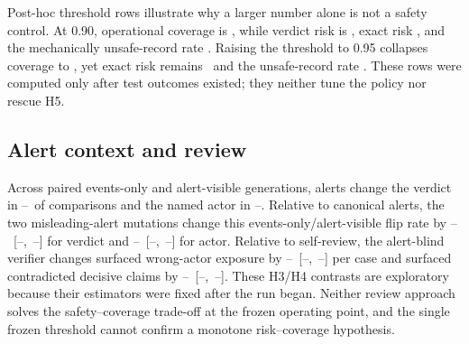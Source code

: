 \documentclass[letterpaper,twocolumn,10pt]{article}
\newcommand{\todoresult}{\textnormal{--}}
\newcommand{\AlertVerdictFlip}{\todoresult}
\newcommand{\AlertActorFlip}{\todoresult}
\providecommand{\HThreeVerdictDifference}{\todoresult}
\providecommand{\HThreeVerdictCILow}{\todoresult}
\providecommand{\HThreeVerdictCIHigh}{\todoresult}
\providecommand{\HThreeActorDifference}{\todoresult}
\providecommand{\HThreeActorCILow}{\todoresult}
\providecommand{\HThreeActorCIHigh}{\todoresult}
\providecommand{\HFourWrongActorDifference}{\todoresult}
\providecommand{\HFourWrongActorCILow}{\todoresult}
\providecommand{\HFourWrongActorCIHigh}{\todoresult}
\providecommand{\HFourContradictedDifference}{\todoresult}
\providecommand{\HFourContradictedCILow}{\todoresult}
\providecommand{\HFourContradictedCIHigh}{\todoresult}
\begin{document}
Post-hoc threshold rows illustrate why a larger number alone is not a safety
control.  At 0.90, operational coverage is \ConfidenceNinetyCoverage, while
verdict risk is \ConfidenceNinetyVerdictRisk, exact risk
\ConfidenceNinetyExactRisk, and the mechanically unsafe-record rate
\ConfidenceNinetyUnsafeRate.  Raising the threshold to 0.95 collapses coverage
to \ConfidenceNinetyFiveCoverage, yet exact risk remains
\ConfidenceNinetyFiveExactRisk\ and the unsafe-record rate
\ConfidenceNinetyFiveUnsafeRate.  These rows were computed only after test
outcomes existed; they neither tune the policy nor rescue H5.
\fi

\subsection{Alert context and review}

Across paired events-only and alert-visible generations, alerts change the
verdict in \AlertVerdictFlip\ of comparisons and the named actor in
\AlertActorFlip.  Relative to canonical alerts, the two misleading-alert
mutations change this events-only/alert-visible flip rate by
\HThreeVerdictDifference\ [\HThreeVerdictCILow,~\HThreeVerdictCIHigh] for
verdict and \HThreeActorDifference\
[\HThreeActorCILow,~\HThreeActorCIHigh] for actor.  Relative to self-review,
the alert-blind verifier changes surfaced wrong-actor exposure by
\HFourWrongActorDifference\ [\HFourWrongActorCILow,~\HFourWrongActorCIHigh]
per case and surfaced contradicted decisive claims by
\HFourContradictedDifference\
[\HFourContradictedCILow,~\HFourContradictedCIHigh].  These H3/H4 contrasts
are exploratory because their estimators were fixed after the run began.
Neither review approach solves the safety--coverage trade-off at the frozen
operating point, and the single frozen threshold cannot confirm a monotone
risk--coverage hypothesis.

\end{document}
